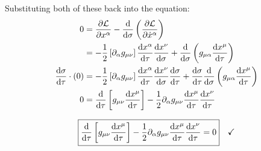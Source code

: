 \documentclass[11pt]{article}
\begin{document}
\begin{enumerate}[label=\alph*)]
Substituting both of these back into the equation:
\begin{align*}
0 & = \pdv{\mathcal{L}}{x^\alpha} -\dv{\sigma}\left(\pdv{\mathcal{L}}{\dot{x}^\alpha}\right)\\
& = -\frac{1}{2}\left[\partial_\alpha g_{\mu\nu}\right]\dv{x^\alpha}{\tau}\dv{x^\nu}{\sigma} + \dv{\sigma}\left(g_{\mu\alpha}\dv{x^\mu}{\tau}\right)\\
\dv{\sigma}{\tau} \cdot (0) & = -\frac{1}{2}\left[\partial_\alpha g_{\mu\nu}\right]\dv{x^\alpha}{\tau}\dv{x^\nu}{\sigma}\dv{\sigma}{\tau} + \dv{\sigma}{\tau}\dv{\sigma}\left(g_{\mu\alpha}\dv{x^\mu}{\tau}\right)\\
0 & = \dv{\tau}\left[g_{\mu\nu}\dv{x^\mu}{\tau}\right] -\frac{1}{2}\partial_\alpha g_{\mu\nu}\dv{x^\mu}{\tau}\dv{x^\nu}{\tau} 
\end{align*}

\[\boxed{\dv{\tau}\left[g_{\mu\nu}\dv{x^\mu}{\tau}\right] -\frac{1}{2}\partial_\alpha g_{\mu\nu}\dv{x^\mu}{\tau}\dv{x^\nu}{\tau} = 0} \quad \checkmark \]

\end{enumerate}
\end{document}
